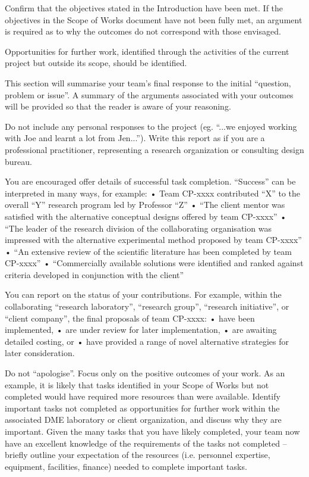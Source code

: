 \color{red}
Confirm that the objectives stated in the Introduction have been met. If the objectives in the Scope of Works document have not been fully met, an argument is required as to why the outcomes do not correspond with those envisaged.

Opportunities for further work, identified through the activities of the current project but outside its scope, should be identified.

This section will summarise your team’s final response to the initial “question, problem or issue”.  A summary of the arguments associated with your outcomes will be provided so that the reader is aware of your reasoning.

Do not include any personal responses to the project (eg. “...we enjoyed working with Joe and learnt a lot from Jen...”).  Write this report as if you are a professional practitioner, representing a research organization or consulting design bureau.

You are encouraged offer details of successful task completion. “Success” can be interpreted in many ways, for example: 
•	Team CP-xxxx contributed “X” to the overall “Y” research program led by Professor “Z”
•	“The client mentor was satisfied with the alternative conceptual designs offered by team CP-xxxx”
•	“The leader of the research division of the collaborating organisation was impressed with the alternative experimental method proposed by team CP-xxxx”
•	“An extensive review of the scientific literature has been completed by team CP-xxxx”
•	“Commercially available solutions were identified and ranked against criteria developed in conjunction with the client”

You can report on the status of your contributions.  For example, within the collaborating “research laboratory”, “research group”, “research initiative”, or “client company”, the final proposals of team CP-xxxx:
•	have been implemented,
•	are under review for later implementation,
•	are awaiting detailed costing, or
•	have provided a range of novel alternative strategies for later consideration.

Do not “apologise”.  Focus only on the positive outcomes of your work.  As an example, it is likely that tasks identified in your Scope of Works but not completed would have required more resources than were available.  Identify important tasks not completed as opportunities for further work within the associated DME laboratory or client organization, and discuss why they are important.  Given the many tasks that you have likely completed, your team now have an excellent knowledge of the requirements of the tasks not completed – briefly outline your expectation of the resources (i.e. personnel expertise, equipment, facilities, finance) needed to complete important tasks.
\color{black}